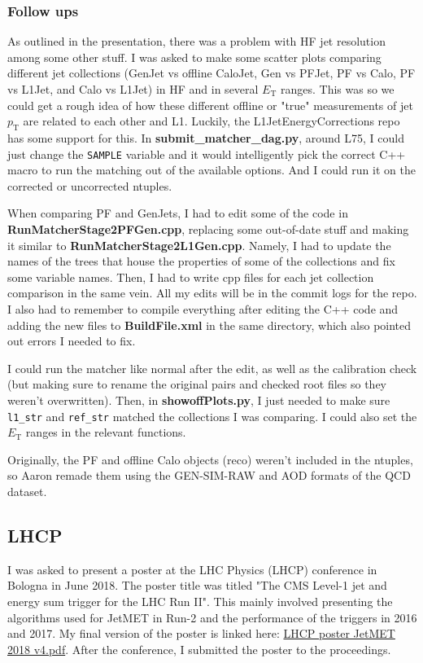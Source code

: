 \subsubsection{Follow ups}

As outlined in the presentation, there was a problem with HF jet resolution among some other stuff. I was asked to make some scatter plots comparing different jet collections (GenJet vs offline CaloJet, Gen vs PFJet, PF vs Calo, PF vs L1Jet, and Calo vs L1Jet) in HF and in several $E_{\mathrm{T}}$ ranges. This was so we could get a rough idea of how these different offline or "true" measurements of jet $p_{\mathrm{T}}$ are related to each other and L1. Luckily, the L1JetEnergyCorrections repo has some support for this. In \textbf{submit\_matcher\_dag.py}, around L75, I could just change the \texttt{SAMPLE} variable and it would intelligently pick the correct C++ macro to run the matching out of the available options. And I could run it on the corrected or uncorrected ntuples.

When comparing PF and GenJets, I had to edit some of the code in \textbf{RunMatcherStage2PFGen.cpp}, replacing some out-of-date stuff and making it similar to \textbf{RunMatcherStage2L1Gen.cpp}. Namely, I had to update the names of the trees that house the properties of some of the collections and fix some variable names. Then, I had to write cpp files for each jet collection comparison in the same vein. All my edits will be in the commit logs for the repo. I also had to remember to compile everything after editing the C++ code and adding the new files to \textbf{BuildFile.xml} in the same directory, which also pointed out errors I needed to fix.

I could run the matcher like normal after the edit, as well as the calibration check (but making sure to rename the original pairs and checked root files so they weren't overwritten). Then, in \textbf{showoffPlots.py}, I just needed to make sure \texttt{l1\_str} and \texttt{ref\_str} matched the collections I was comparing. I could also set the $E_{\mathrm{T}}$ ranges in the relevant functions.

Originally, the PF and offline Calo objects (reco) weren't included in the ntuples, so Aaron remade them using the GEN-SIM-RAW and AOD formats of the QCD dataset.

\subsection{LHCP}

I was asked to present a poster at the LHC Physics (LHCP) conference in Bologna in June 2018. The poster title was titled "The CMS Level-1 jet and energy sum trigger for the LHC Run II". This mainly involved presenting the algorithms used for JetMET in Run-2 and the performance of the triggers in 2016 and 2017. My final version of the poster is linked here: \href{run:./sec20/LHCP poster JetMET 2018 v4.pdf}{LHCP poster JetMET 2018 v4.pdf}. After the conference, I submitted the poster to the proceedings.
